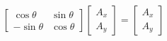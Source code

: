 \begin{equation}
\left[
\begin{array}{cc}
\cos\theta & \sin\theta\\
-\sin\theta & \cos\theta
\end{array}\right]
\left[
\begin{array}{c}
A_x \\ 
A_y 
\end{array}
\right]
=\left[
\begin{array}{c}
A_{x} \\ 
A_{y} 
\end{array}
\right]
\end{equation}